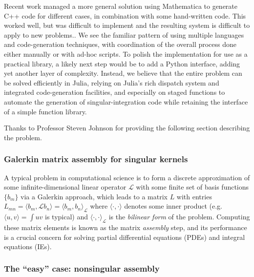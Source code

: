 Recent work \cite{ReidWhJo14} managed a more general solution
using Mathematica to generate C++ code for different cases, in combination with some hand-written code.
This worked well, but was difficult to implement and the resulting system
is difficult to apply to new problems..
We see the familiar pattern of using multiple languages and
code-generation techniques, with coordination of the overall process done
either manually or with ad-hoc scripts.
To polish the implementation for use as a practical library, a likely next
step would be to add a Python interface, adding yet another layer of complexity.
Instead, we believe that the entire problem can be solved efficiently in Julia,
relying on Julia's rich dispatch system and integrated code-generation facilities,
and especially on staged functions to automate the generation of singular-integration
code while retaining the interface of a simple function library.



Thanks to Professor Steven Johnson for providing the following section describing
the problem.

\subsubsection{Galerkin matrix assembly for singular kernels}

A typical problem in computational science is to form a discrete approximation
of some infinite-dimensional linear operator $\mathcal{L}$ with some finite set of
basis functions $\{ b_m \}$ via a Galerkin approach\cite{Boyd01,Bonnet99,Zienkiewicz13}, which leads to a
matrix $L$ with entries
$L_{mn} = \langle b_m, \mathcal{L} b_n \rangle = \langle b_m, b_n \rangle_\mathcal{L}$
where $\langle \cdot, \cdot \rangle$ denotes some inner product
(e.g.\ $\langle u, v \rangle = \int u v$ is typical) and
$\langle \cdot, \cdot \rangle_\mathcal{L}$ is the \emph{bilinear form} of the problem.
Computing these matrix elements is known as the matrix \emph{assembly} step, and its
performance is a crucial concern for solving partial differential equations (PDEs) and
integral equations (IEs).

\iffalse
\subsubsection{The ``easy'' case: nonsingular assembly}

